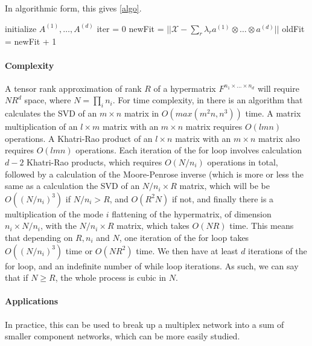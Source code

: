 \documentclass{report}
\theoremstyle{definition}
\theoremstyle{remark}
\begin{document}
In algorithmic form, this gives \ref{algo}.

\begin{algorithm}\label{algo}
initialize $A^{(1)}, \dots, A^{(d)}$ \;
iter = 0 \;
newFit = $||\mathcal{X} - \sum_r \lambda_r a^{(1)}\otimes \dots \otimes a^{(d)}||$ \;
oldFit = newFit + 1 \;
\end{algorithm}

\paragraph{Complexity} A tensor rank approximation of rank $R$ of a hypermatrix $F^{n_1 \times \dots \times n_d}$ will require $NR^d$ space, where $N = \prod_i n_i$.
For time complexity, in \cite{VLG} there is an algorithm that calculates the SVD of an $m \times n$ matrix in $O(max(m^2n,n^3))$ time. A matrix multiplication of an $l\times m$ matrix with an $m\times n$ matrix requires $O(lmn)$ operations. A Khatri-Rao product of an $l \times n$ matrix with an $m \times n$ matrix also requires $O(lmn)$ operations. Each iteration of the for loop involves calculation $d-2$ Khatri-Rao products, which requires $O(N/n_i)$ operations in total, followed by a calculation of the Moore-Penrose inverse (which is more or less the same as a calculation the SVD of an $N/n_i \times R$ matrix, which will be be $O((N/n_i)^3)$ if $N/n_i>R$, and $O(R^2N)$ if not, and finally there is a multiplication of the mode $i$ flattening of the hypermatrix, of dimension $n_i \times N/n_i$, with the   $N/n_i \times R$ matrix, which takes $O(NR)$ time. 
This means that depending on $R,n_i$ and $N$, one iteration of the for loop takes $O((N/n_i)^3)$ time or $O(NR^2)$ time. We then have at least $d$ iterations of the for loop, and an indefinite number of while loop iterations. As such, we can say that if $N\geq R$, the whole process is cubic in $N$.


\paragraph{Applications} In practice, this can be used to break up a multiplex network into a sum of smaller component networks, which can be more easily studied. 
\end{document}
